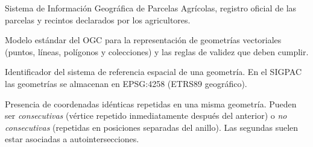 \begin{description}[leftmargin=0pt, labelindent=0pt, labelsep=0pt, style=nextline, itemsep=0.9em, font=\normalfont\bfseries]
	 Sistema de Información Geográfica de Parcelas Agrícolas, registro oficial de las parcelas y recintos declarados por los agricultores.

	 Modelo estándar del OGC para la representación de geometrías vectoriales (puntos, líneas, polígonos y colecciones) y las reglas de validez que deben cumplir.

	 Identificador del sistema de referencia espacial de una geometría. En el SIGPAC las geometrías se almacenan en EPSG:4258 (ETRS89 geográfico).

	 Presencia de coordenadas idénticas repetidas en una misma geometría. Pueden ser \emph{consecutivas} (vértice repetido inmediatamente después del anterior) o \emph{no consecutivas} (repetidas en posiciones separadas del anillo). Las segundas suelen estar asociadas a autointersecciones.

\end{description}

